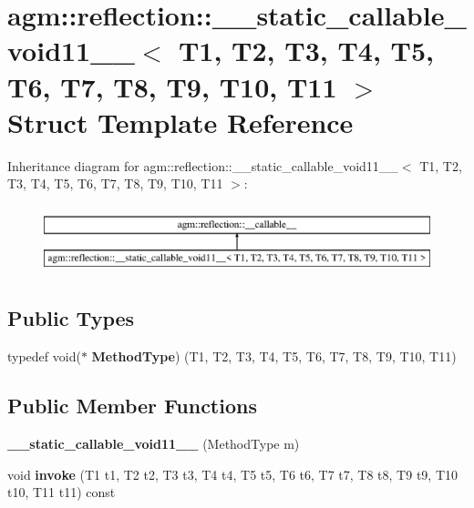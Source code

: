 \hypertarget{structagm_1_1reflection_1_1____static__callable__void11____}{}\section{agm\+:\+:reflection\+:\+:\+\_\+\+\_\+static\+\_\+callable\+\_\+void11\+\_\+\+\_\+$<$ T1, T2, T3, T4, T5, T6, T7, T8, T9, T10, T11 $>$ Struct Template Reference}
\label{structagm_1_1reflection_1_1____static__callable__void11____}
Inheritance diagram for agm\+:\+:reflection\+:\+:\+\_\+\+\_\+static\+\_\+callable\+\_\+void11\+\_\+\+\_\+$<$ T1, T2, T3, T4, T5, T6, T7, T8, T9, T10, T11 $>$\+:\begin{figure}[H]
\begin{center}
\leavevmode
\includegraphics[height=2.000000cm]{structagm_1_1reflection_1_1____static__callable__void11____}
\end{center}
\end{figure}
\subsection*{Public Types}
\begin{DoxyCompactItemize}
\item 
typedef void($\ast$ {\bfseries Method\+Type}) (T1, T2, T3, T4, T5, T6, T7, T8, T9, T10, T11)\hypertarget{structagm_1_1reflection_1_1____static__callable__void11_____a1a807d5984b2f445c4ad5bf41daec058}{}\label{structagm_1_1reflection_1_1____static__callable__void11_____a1a807d5984b2f445c4ad5bf41daec058}

\end{DoxyCompactItemize}
\subsection*{Public Member Functions}
\begin{DoxyCompactItemize}
\item 
{\bfseries \+\_\+\+\_\+static\+\_\+callable\+\_\+void11\+\_\+\+\_\+} (Method\+Type m)\hypertarget{structagm_1_1reflection_1_1____static__callable__void11_____a9ee51c471f2e2783a9467c576efb74df}{}\label{structagm_1_1reflection_1_1____static__callable__void11_____a9ee51c471f2e2783a9467c576efb74df}

\item 
void {\bfseries invoke} (T1 t1, T2 t2, T3 t3, T4 t4, T5 t5, T6 t6, T7 t7, T8 t8, T9 t9, T10 t10, T11 t11) const \hypertarget{structagm_1_1reflection_1_1____static__callable__void11_____a53060f7975fb30088262bc1a7f9c38d4}{}\label{structagm_1_1reflection_1_1____static__callable__void11_____a53060f7975fb30088262bc1a7f9c38d4}

\end{DoxyCompactItemize}

